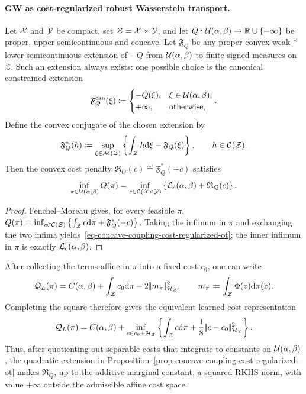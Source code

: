 \paragraph{GW as cost-regularized robust Wasserstein transport.}
\begin{prop}\label{prop-concave-coupling-cost-regularized-ot}
Let $\mathcal{X}$ and $\mathcal{Y}$ be compact, set $\mathcal Z=\mathcal{X}\times\mathcal{Y}$, and let $Q:\mathcal{U}(\alpha,\beta)\to\mathbb{R}\cup\{-\infty\}$ be proper, upper semicontinuous and concave. Let $\mathfrak F_Q$ be any proper convex weak-* lower-semicontinuous extension of $-Q$ from $\mathcal{U}(\alpha,\beta)$ to finite signed measures on $\mathcal Z$. Such an extension always exists: one possible choice is the canonical constrained extension
\[
\mathfrak F_Q^{\mathrm{can}}(\xi)
\coloneqq
\begin{cases}
-Q(\xi), & \xi\in\mathcal{U}(\alpha,\beta),\\
+\infty, & \text{otherwise},
\end{cases}.
\]
Define the convex conjugate of the chosen extension by
\[
\mathfrak F_Q^*(h)
\coloneqq
\sup_{\xi\in\mathcal{M}(\mathcal Z)}
\left\{\int_{\mathcal Z}h\mathrm{d}\xi-\mathfrak F_Q(\xi)\right\},
\qquad h\in\mathcal{C}(\mathcal Z).
\]
Then the convex cost penalty $\mathfrak R_Q(c)\eqdef\mathfrak F_Q^*(-c)$ satisfies
\begin{equation}\label{eq-concave-coupling-cost-regularized-ot}
\inf_{\pi\in\mathcal{U}(\alpha,\beta)}Q(\pi)
=
\inf_{c\in\mathcal{C}(\mathcal{X}\times\mathcal{Y})}
\left\{\mathcal{L}_c(\alpha,\beta)+\mathfrak R_Q(c)\right\}.
\end{equation}
\end{prop}
\begin{proof}
Fenchel--Moreau gives, for every feasible $\pi$,
$Q(\pi) = \inf_{c\in\mathcal{C}(\mathcal Z)} \left\{\int_{\mathcal Z}c\mathrm{d}\pi+\mathfrak F_Q^*(-c)\right\}$.
Taking the infimum in $\pi$ and exchanging the two infima yields~\eqref{eq-concave-coupling-cost-regularized-ot}; the inner infimum in $\pi$ is exactly $\mathcal{L}_c(\alpha,\beta)$.
\end{proof}
After collecting the terms affine in $\pi$ into a fixed cost $c_0$, one can write
\[
\mathcal Q_L(\pi)
=
C(\alpha,\beta)
+
\int_{\mathcal Z}c_0\mathrm{d}\pi
-
2|\!| m_\pi |\!|_{\mathcal{H}_{\mathcal Z}}^2,
\qquad
m_\pi\coloneqq\int_{\mathcal Z}\Phi(z)\mathrm{d}\pi(z).
\]
Completing the square therefore gives the equivalent learned-cost representation
\begin{equation}\label{eq-gw-rkhs-cost-regularization}
\mathcal Q_L(\pi)
=
C(\alpha,\beta)
+
\inf_{c\in c_0+\mathcal{H}_{\mathcal Z}}
\left\{
\int_{\mathcal Z}c\mathrm{d}\pi
+
\frac18|\!| c-c_0 |\!|_{\mathcal{H}_{\mathcal Z}}^2
\right\}.
\end{equation}
Thus, after quotienting out separable costs that integrate to constants on $\mathcal{U}(\alpha,\beta)$, the quadratic extension in Proposition~\ref{prop-concave-coupling-cost-regularized-ot} makes $\mathfrak R_Q$, up to the additive marginal constant, a squared RKHS norm, with value $+\infty$ outside the admissible affine cost space.

